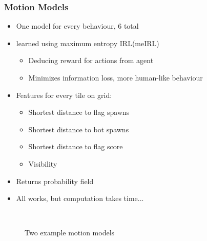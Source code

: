\documentclass{beamer}
\begin{document}
\begin{frame}
    \frametitle{Motion Models}
    \begin{itemize}
        \item One model for every behaviour, 6 total
        \item learned using maximum entropy IRL(meIRL)
            \begin{itemize}
                \item Deducing reward for actions from agent
                \item Minimizes information loss, more human-like
                    behaviour\citep{6374144}
            \end{itemize}
        \item Features for every tile on grid:
            \begin{itemize}
                \item Shortest distance to flag spawns
                \item Shortest distance to bot spawns
                \item Shortest distance to flag score
                \item Visibility 
            \end{itemize}
        \item Returns probability field
        \item All works, but computation takes time...
    \end{itemize}
\end{frame}
\begin{frame}
\begin{figure}
\centering
\mbox{\quad
{}}
\caption{Two example motion models} 
\end{figure}
\end{frame}
\end{document}
